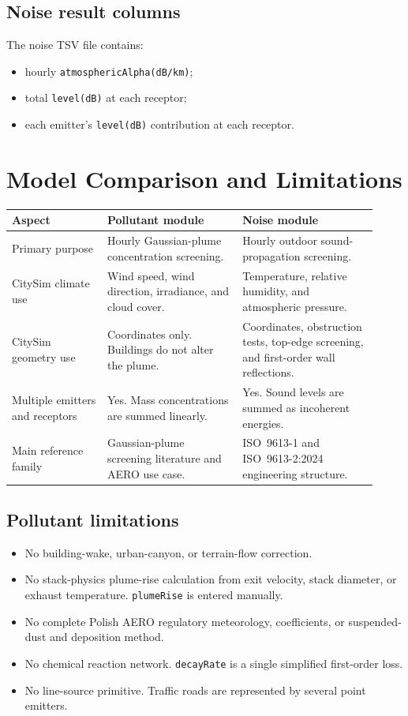 \documentclass[11pt,a4paper]{article}
\newcommand{\code}[1]{\texttt{#1}}
\newcommand{\toprule}{\hline}
\newcommand{\midrule}{\hline}
\newcommand{\bottomrule}{\hline}
\begin{document}
\subsection{Noise result columns}

The noise TSV file contains:
\begin{itemize}
  \item hourly \code{atmosphericAlpha(dB/km)};
  \item total \code{level(dB)} at each receptor;
  \item each emitter's \code{level(dB)} contribution at each receptor.
\end{itemize}

\section{Model Comparison and Limitations}

\begin{longtable}{L{0.24\linewidth} L{0.34\linewidth} L{0.34\linewidth}}
\toprule
Aspect & Pollutant module & Noise module \\
\midrule
\endhead
Primary purpose &
Hourly Gaussian-plume concentration screening. &
Hourly outdoor sound-propagation screening. \\
CitySim climate use &
Wind speed, wind direction, irradiance, and cloud cover. &
Temperature, relative humidity, and atmospheric pressure. \\
CitySim geometry use &
Coordinates only. Buildings do not alter the plume. &
Coordinates, obstruction tests, top-edge screening, and first-order wall reflections. \\
Multiple emitters and receptors &
Yes. Mass concentrations are summed linearly. &
Yes. Sound levels are summed as incoherent energies. \\
Main reference family &
Gaussian-plume screening literature and AERO use case. &
ISO~9613-1 and ISO~9613-2:2024 engineering structure. \\
\bottomrule
\end{longtable}

\subsection{Pollutant limitations}

\begin{itemize}
  \item No building-wake, urban-canyon, or terrain-flow correction.
  \item No stack-physics plume-rise calculation from exit velocity, stack
        diameter, or exhaust temperature. \code{plumeRise} is entered manually.
  \item No complete Polish AERO regulatory meteorology, coefficients, or
        suspended-dust and deposition method.
  \item No chemical reaction network. \code{decayRate} is a single simplified
        first-order loss.
  \item No line-source primitive. Traffic roads are represented by several
        point emitters.
\end{itemize}
\end{document}
